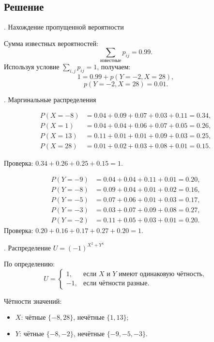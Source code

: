 \documentclass[a4paper,14pt]{extarticle}
\begin{document}
        \subsection*{Решение}

        . Нахождение пропущенной вероятности

        Сумма известных вероятностей:
        \[
        \sum_{\text{известные}} p_{ij} = 0.99.
        \]
        Используя условие $\sum_{i,j} p_{ij} = 1$, получаем:
        \[
        1 = 0.99 + p(Y=-2, X=28),
        \]
        \[
        \boxed{p(Y=-2, X=28) = 0.01.}
        \]

        . Маргинальные распределения
        
        \[
        \begin{aligned}
        P(X=-8) &= 0.04 + 0.09 + 0.07 + 0.03 + 0.11 = 0.34, \\
        P(X=1)  &= 0.04 + 0.04 + 0.06 + 0.07 + 0.05 = 0.26, \\
        P(X=13) &= 0.11 + 0.01 + 0.01 + 0.09 + 0.03 = 0.25, \\
        P(X=28) &= 0.01 + 0.02 + 0.03 + 0.08 + 0.01 = 0.15.
        \end{aligned}
        \]

        Проверка: $0.34 + 0.26 + 0.25 + 0.15 = 1.$

        \[
        \begin{aligned}
        P(Y=-9) &= 0.04 + 0.04 + 0.11 + 0.01 = 0.20, \\
        P(Y=-8) &= 0.09 + 0.04 + 0.01 + 0.02 = 0.16, \\
        P(Y=-5) &= 0.07 + 0.06 + 0.01 + 0.03 = 0.17, \\
        P(Y=-3) &= 0.03 + 0.07 + 0.09 + 0.08 = 0.27, \\
        P(Y=-2) &= 0.11 + 0.05 + 0.03 + 0.01 = 0.20.
        \end{aligned}
        \]
        Проверка: $0.20 + 0.16 + 0.17 + 0.27 + 0.20 = 1.$

        . Распределение $U = (-1)^{X^2 + Y^4}$

        По определению:
        \[
        U = 
        \begin{cases}
        1, & \text{если } X \text{ и } Y \text{ имеют одинаковую чётность},\\
        -1, & \text{если чётности разные.}
        \end{cases}
        \]

        Чётности значений:
        \begin{itemize}
            \item $X$: чётные $\{-8, 28\}$, нечётные $\{1, 13\}$;
            \item $Y$: чётные $\{-8, -2\}$, нечётные $\{-9, -5, -3\}$.
        \end{itemize}
\end{document}
